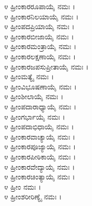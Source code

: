 
೪ ಹ್ರೀಂಕಾರರೂಪಾಯೈ ನಮಃ ।\\
೪ ಹ್ರೀಂಕಾರನಿಲಯಾಯೈ ನಮಃ ।\\
೪ ಹ್ರೀಂಪದಪ್ರಿಯಾಯೈ ನಮಃ ।\\
೪ ಹ್ರೀಂಕಾರಬೀಜಾಯೈ ನಮಃ ।\\
೪ ಹ್ರೀಂಕಾರಮಂತ್ರಾಯೈ ನಮಃ ।\\
೪ ಹ್ರೀಂಕಾರಲಕ್ಷಣಾಯೈ ನಮಃ ।\\
೪ ಹ್ರೀಂಕಾರಜಪಸುಪ್ರೀತಾಯೈ ನಮಃ ।\\
೪ ಹ್ರೀಂಮತ್ಯೈ ನಮಃ ।\\
೪ ಹ್ರೀಂವಿಭೂಷಣಾಯೈ ನಮಃ ।\\
೪ ಹ್ರೀಂಶೀಲಾಯೈ ನಮಃ ।\\
೪ ಹ್ರೀಂಪದಾರಾಧ್ಯಾಯೈ ನಮಃ ।\\
೪ ಹ್ರೀಂಗರ್ಭಾಯೈ ನಮಃ ।\\
೪ ಹ್ರೀಂಪದಾಭಿಧಾಯೈ ನಮಃ ।\\
೪ ಹ್ರೀಂಕಾರವಾಚ್ಯಾಯೈ ನಮಃ ।\\
೪ ಹ್ರೀಂಕಾರಪೂಜ್ಯಾಯೈ ನಮಃ ।\\
೪ ಹ್ರೀಂಕಾರಪೀಠಿಕಾಯೈ ನಮಃ ।\\
೪ ಹ್ರೀಂಕಾರವೇದ್ಯಾಯೈ ನಮಃ ।\\
೪ ಹ್ರೀಂಕಾರಚಿಂತ್ಯಾಯೈ ನಮಃ ।\\
೪ ಹ್ರೀಂ ನಮಃ ।\\
೪ ಹ್ರೀಂಶರೀರಿಣ್ಯೈ ನಮಃ । 

